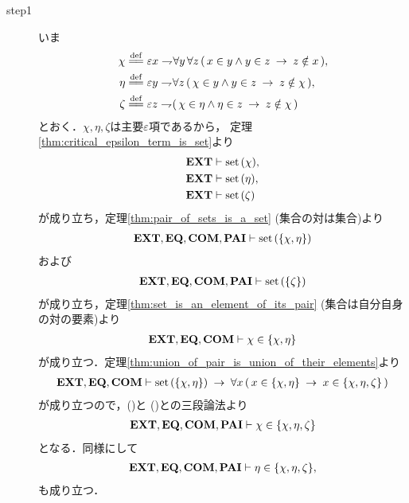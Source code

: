 	\begin{sketch}\mbox{}
		\begin{description}
			\item[step1] いま
				\begin{align}
					\chi &\defeq \varepsilon x \negation \forall y\, \forall z\, 
						(\, x \in y \wedge y \in z \rarrow z \notin x\, ), \\
					\eta &\defeq \varepsilon y \negation \forall z\, 
						(\, \chi \in y \wedge y \in z \rarrow z \notin \chi\, ), \\
					\zeta &\defeq \varepsilon z \negation 
						(\, \chi \in \eta \wedge \eta \in z 
						\rarrow z \notin \chi\, )
				\end{align}
				とおく．$\chi,\eta,\zeta$は主要$\varepsilon$項であるから，
				定理\ref{thm:critical_epsilon_term_is_set}より
				\begin{align}
					\mbox{{\bf EXT}} &\vdash \operatorname*{set}\hspace{0.15em}(\chi), 
					\label{fom:no_three_sets_go_round_1} \\
					\mbox{{\bf EXT}} &\vdash \operatorname*{set}\hspace{0.15em}(\eta), 
					\label{fom:no_three_sets_go_round_2} \\
					\mbox{{\bf EXT}} &\vdash \operatorname*{set}\hspace{0.15em}(\zeta) 
					\label{fom:no_three_sets_go_round_3}
				\end{align}
				が成り立ち，定理\ref{thm:pair_of_sets_is_a_set} (集合の対は集合)より
				\begin{align}
					\mbox{{\bf EXT}},\mbox{{\bf EQ}},\mbox{\bf COM},\mbox{{\bf PAI}} \vdash \operatorname*{set}\hspace{0.15em}(\{\chi,\eta\})
					\label{fom:no_three_sets_go_round_4}
				\end{align}
				および
				\begin{align}
					\mbox{{\bf EXT}},\mbox{{\bf EQ}},\mbox{\bf COM},\mbox{{\bf PAI}} \vdash \operatorname*{set}\hspace{0.15em}(\{\zeta\})
					\label{fom:no_three_sets_go_round_5}
				\end{align}
				が成り立ち，定理\ref{thm:set_is_an_element_of_its_pair}
				(集合は自分自身の対の要素)より
				\begin{align}
					\mbox{{\bf EXT}},\mbox{{\bf EQ}},\mbox{\bf COM} \vdash \chi \in \{\chi,\eta\}
					\label{fom:no_three_sets_go_round_6}
				\end{align}
				が成り立つ．定理\ref{thm:union_of_pair_is_union_of_their_elements}より
				\begin{align}
					\mbox{{\bf EXT}},\mbox{{\bf EQ}},\mbox{\bf COM} \vdash 
					\operatorname*{set}\hspace{0.15em}(\{\chi,\eta\}) \hspace{0.25em}\rightarrow\hspace{0.25em} \forall x\, (\, x \in \{\chi,\eta\}
					\hspace{0.25em}\rightarrow\hspace{0.25em} x \in \{\chi,\eta,\zeta\}\, )
				\end{align}
				が成り立つので，()と
				()との三段論法より
				\begin{align}
					\mbox{{\bf EXT}},\mbox{{\bf EQ}},\mbox{\bf COM},\mbox{{\bf PAI}} \vdash \chi \in \{\chi,\eta,\zeta\}
					\label{fom:no_three_sets_go_round_7}
				\end{align}
				となる．同様にして
				\begin{align}
					\mbox{{\bf EXT}},\mbox{{\bf EQ}},\mbox{\bf COM},\mbox{{\bf PAI}} \vdash \eta \in \{\chi,\eta,\zeta\},
					\label{fom:no_three_sets_go_round_8}
				\end{align}
				も成り立つ．
				

\end{description}
\end{sketch}
